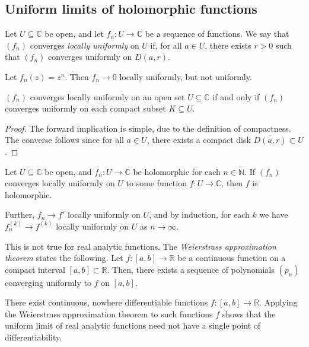 \subsection{Uniform limits of holomorphic functions}
\begin{definition}
	Let \( U \subseteq \mathbb C \) be open, and let \( f_n \colon U \to \mathbb C \) be a sequence of functions.
	We say that \( (f_n) \) converges \textit{locally uniformly} on \( U \) if, for all \( a \in U \), there exists \( r > 0 \) such that \( (f_n) \) converges uniformly on \( D(a,r) \).
\end{definition}
\begin{example}
	Let \( f_n(z) = z^n \).
	Then \( f_n \to 0 \) locally uniformly, but not uniformly.
\end{example}
\begin{proposition}
	\( (f_n) \) converges locally uniformly on an open set \( U \subseteq \mathbb C \) if and only if \( (f_n) \) converges uniformly on each compact subset \( K \subseteq U \).
\end{proposition}
\begin{proof}
	The forward implication is simple, due to the definition of compactness.
	The converse follows since for all \( a \in U \), there exists a compact disk \( \overline{D(a,r)} \subset U \).
\end{proof}
\begin{theorem}
	Let \( U \subseteq \mathbb C \) be open, and \( f_n \colon U \to \mathbb C \) be holomorphic for each \( n \in \mathbb N \).
	If \( (f_n) \) converges locally uniformly on \( U \) to some function \( f \colon U \to \mathbb C \), then \( f \) is holomorphic.

	Further, \( f_n \to f' \) locally uniformly on \( U \), and by induction, for each \( k \) we have \( f_n^{(k)} \to f^{(k)} \) locally uniformly on \( U \) as \( n \to \infty \).
\end{theorem}
\begin{remark}
	This is not true for real analytic functions.
	The \textit{Weierstrass approximation theorem} states the following.
	Let \( f \colon [a,b] \to \mathbb R \) be a continuous function on a compact interval \( [a,b] \subset \mathbb R \).
	Then, there exists a sequence of polynomials \( (p_n) \) converging uniformly to \( f \) on \( [a,b] \).

	There exist continuous, nowhere differentiable functions \( f \colon [a,b] \to \mathbb R \).
	Applying the Weierstrass approximation theorem to such functions \( f \) shows that the uniform limit of real analytic functions need not have a single point of differentiability.
\end{remark}
